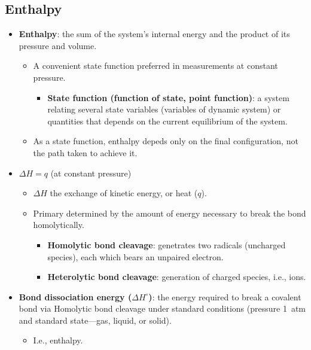 \documentclass[12pt,a4paper]{article}
\begin{document}
\subsection{Enthalpy}
\begin{itemize}
    \item \textbf{Enthalpy}: the sum of the system's internal energy and the product of its pressure and volume.
        \begin{itemize}
            \item A convenient state function preferred in measurements at constant pressure.
                \begin{itemize}
                    \item \textbf{State function (function of state, point function)}: a system relating several state variables (variables of dynamic system) or quantities that depends on the current equilibrium of the system.
                \end{itemize}
            \item As a state function, enthalpy depeds only on the final configuration, not the path taken to achieve it.
        \end{itemize}
    \item \(\Delta H= q\) (at constant pressure)
        \begin{itemize}
            \item \(\Delta H\) the exchange of kinetic energy, or heat (\(q\)).
            \item Primary determined by the amount of energy necessary to break the bond {\color{o-Sun}homolytically}.
                \begin{itemize}
                    \item \textbf{Homolytic bond cleavage}: genetrates two radicals (uncharged species), each which bears an unpaired electron.
                    \item \textbf{Heterolytic bond cleavage}: generation of charged species, i.e., ions.
                \end{itemize}
        \end{itemize}
    \item \textbf{Bond dissociation energy (\(\Delta H^\circ\))}: the energy required to break a covalent bond via Homolytic bond cleavage under {\color{o-Sun}standard conditions} (pressure \SI{1}{atm} and standard state---gas, liquid, or solid).
        \begin{itemize}
            \item I.e., enthalpy.
        \end{itemize}

\end{itemize}
\end{document}

